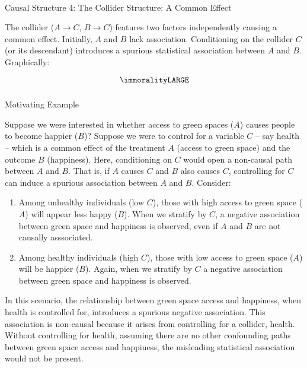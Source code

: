\documentclass[
  singlecolumn]{article}
\makeatletter
\let\oldparagraph\paragraph
\renewcommand{\paragraph}{
    \@ifstar
      \xxxParagraphStar
      \xxxParagraphNoStar
  }
\newcommand{\xxxParagraphStar}[1]{\oldparagraph*{#1}\mbox{}}
\newcommand{\xxxParagraphNoStar}[1]{\oldparagraph{#1}\mbox{}}
\let\oldsubparagraph\subparagraph
\renewcommand{\subparagraph}{
    \@ifstar
      \xxxSubParagraphStar
      \xxxSubParagraphNoStar
  }
\newcommand{\xxxSubParagraphStar}[1]{\oldsubparagraph*{#1}\mbox{}}
\newcommand{\xxxSubParagraphNoStar}[1]{\oldsubparagraph{#1}\mbox{}}
\makeatother
\begin{document}
\paragraph{Causal Structure 4: The Collider Structure: A Common
Effect}\label{causal-structure-4-the-collider-structure-a-common-effect}

The collider (\(A\to C\), \(B \to C\)) features two factors
independently causing a common effect. Initially, \(A\) and \(B\) lack
association. Conditioning on the collider \(C\) (or its descendant)
introduces a spurious statistical association between \(A\) and \(B\).
Graphically:

\[\immoralityLARGE\]

\subparagraph{Motivating Example}\label{motivating-example-3}

Suppose we were interested in whether access to green spaces (\(A\))
causes people to become happier (\(B\))? Suppose we were to control for
a variable \(C\) -- say health -- which is a common effect of the
treatment \(A\) (access to green space) and the outcome \(B\)
(happiness). Here, conditioning on \(C\) would open a non-causal path
between \(A\) and \(B\). That is, if \(A\) causes \(C\) and \(B\) also
causes \(C\), controlling for \(C\) can induce a spurious association
between \(A\) and \(B\). Consider:

\begin{enumerate}
\def\labelenumi{\arabic{enumi}.}
\item
  Among unhealthy individuals (low \(C\)), those with high access to
  green space (\(A\)) will appear less happy (\(B\)). When we stratify
  by \(C\), a negative association between green space and happiness is
  observed, even if \(A\) and \(B\) are not causally asssociated.
\item
  Among healthy individuals (high \(C\)), those with low access to green
  space (\(A\)) will be happier (\(B\)). Again, when we stratify by
  \(C\) a negative association between green space and happiness is
  observed.
\end{enumerate}

In this scenario, the relationship between green space access and
happiness, when health is controlled for, introduces a spurious negative
association. This association is non-causal because it arises from
controlling for a collider, health. Without controlling for health,
assuming there are no other confounding paths between green space access
and happiness, the misleading statistical association would not be
present.
\end{document}
